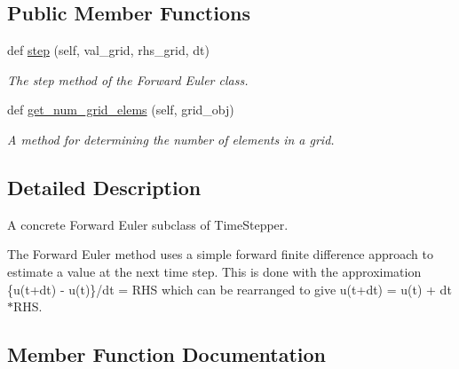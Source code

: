 \subsection*{Public Member Functions}
\begin{DoxyCompactItemize}
\item 
def \hyperlink{classMain__PDE__Repo_1_1src_1_1forward__euler_1_1ForwardEuler_aafec83c8cc54107baf7aa842563199b0}{step} (self, val\+\_\+grid, rhs\+\_\+grid, dt)
\begin{DoxyCompactList}\small\item\em The step method of the Forward Euler class. \end{DoxyCompactList}\item 
def \hyperlink{classMain__PDE__Repo_1_1src_1_1forward__euler_1_1ForwardEuler_aebafa27619dffaadc2f9b1c7f6240892}{get\+\_\+num\+\_\+grid\+\_\+elems} (self, grid\+\_\+obj)
\begin{DoxyCompactList}\small\item\em A method for determining the number of elements in a grid. \end{DoxyCompactList}\end{DoxyCompactItemize}


\subsection{Detailed Description}
A concrete Forward Euler subclass of Time\+Stepper. 

The Forward Euler method uses a simple forward finite difference approach to estimate a value at the next time step. This is done with the approximation \{u(t+dt) -\/ u(t)\}/dt = R\+HS which can be rearranged to give u(t+dt) = u(t) + dt$\ast$\+R\+HS. 

\subsection{Member Function Documentation}
\mbox{\label{classMain__PDE__Repo_1_1src_1_1forward__euler_1_1ForwardEuler_aebafa27619dffaadc2f9b1c7f6240892}} 
